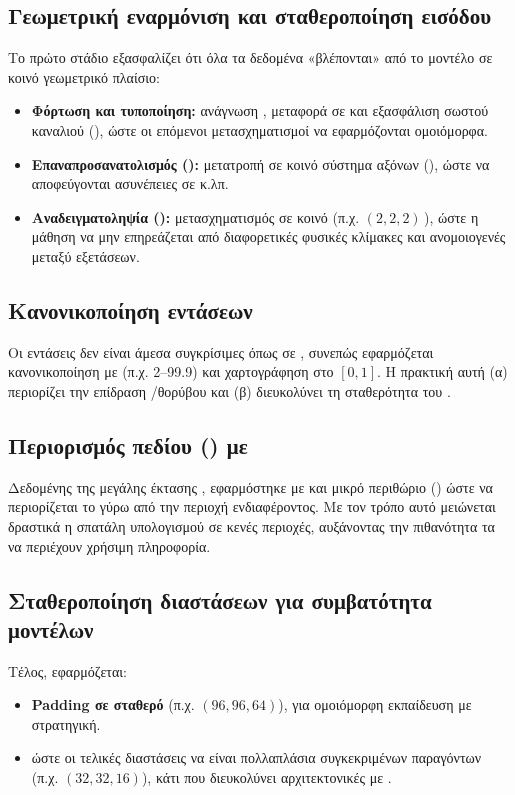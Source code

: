 \subsection{Γεωμετρική εναρμόνιση και σταθεροποίηση εισόδου}
Το πρώτο στάδιο εξασφαλίζει ότι όλα τα δεδομένα «βλέπονται» από το μοντέλο
σε κοινό γεωμετρικό πλαίσιο:
\begin{itemize}
  \item \textbf{Φόρτωση και τυποποίηση:} ανάγνωση , μεταφορά σε
         και εξασφάλιση σωστού καναλιού (),
        ώστε οι επόμενοι μετασχηματισμοί να εφαρμόζονται ομοιόμορφα.
  \item \textbf{Επαναπροσανατολισμός ():} μετατροπή σε κοινό
        σύστημα αξόνων (), ώστε να αποφεύγονται ασυνέπειες σε
         κ.λπ.
  \item \textbf{Αναδειγματοληψία ():} μετασχηματισμός σε κοινό
         (π.χ. $(2,2,2)$\,), ώστε η μάθηση να μην
        επηρεάζεται από διαφορετικές φυσικές κλίμακες και ανομοιογενές
         μεταξύ εξετάσεων.
\end{itemize}

\subsection{Κανονικοποίηση εντάσεων}
Οι  εντάσεις δεν είναι άμεσα συγκρίσιμες όπως σε , συνεπώς
εφαρμόζεται κανονικοποίηση με  (π.χ. 2--99.9) και
χαρτογράφηση στο $[0,1]$. Η πρακτική αυτή (α) περιορίζει την επίδραση
/θορύβου και (β) διευκολύνει τη σταθερότητα του .

\subsection{Περιορισμός πεδίου () με }
Δεδομένης της μεγάλης έκτασης , εφαρμόστηκε 
με  και μικρό περιθώριο () ώστε να
περιορίζεται το  γύρω από την περιοχή ενδιαφέροντος. Με τον τρόπο
αυτό μειώνεται δραστικά η σπατάλη υπολογισμού σε κενές περιοχές, αυξάνοντας
την πιθανότητα τα  να περιέχουν χρήσιμη πληροφορία.

\subsection{Σταθεροποίηση διαστάσεων για συμβατότητα μοντέλων}
Τέλος, εφαρμόζεται:
\begin{itemize}
  \item \textbf{Padding σε σταθερό } (π.χ. $(96,96,64)$), για
        ομοιόμορφη εκπαίδευση με  στρατηγική.
  \item \textbf{} ώστε οι τελικές διαστάσεις να είναι
        πολλαπλάσια συγκεκριμένων παραγόντων (π.χ. $(32,32,16)$), κάτι που
        διευκολύνει αρχιτεκτονικές με .
\end{itemize}

